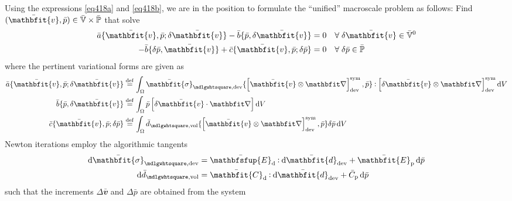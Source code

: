 \documentclass[10pt,a4paper]{article}
\renewcommand{\ta}[1]{\mathbfit{#1}}
\renewcommand{\ts}[1]{\mathbfit{#1}}
\renewcommand{\tf}[1]{\mathbfsfup{#1}}
\renewcommand{\Box}{\mdlgwhtsquare}
\newcommand{\ded}{\mathrm{d}}
\newcommand{\dep}{\mathrm{p}}
\begin{document}
Using the expressions \eqref{eq418a} and \eqref{eq418b}, we are in the position to formulate the ``unified'' macroscale problem as follows: Find $(\bar{\ta v},\bar p) \in\bar{\set V}\times\bar{\set{P}}$ that solve
\begin{align}
 \bar a\{\bar{\ta v},\bar p; \delta\bar{\ta v}\} - \bar b\{\bar p, \delta\bar{\ta v}\} &= 0   \quad \forall\; \delta\bar{\ta v} \in \bar{\set{V}}^0
 \label{eq411a}\\
 - \bar b\{\delta\bar p, \bar{\ta v}\} + \bar c\{\bar{\ta v}, \bar p; \delta\bar p\}&= 0   \quad \forall\; \delta\bar p \in \bar{\set{P}}
 \label{eq411b}
\end{align}
where the pertinent variational forms are given as
\begin{align}
 \bar a\{\bar{\ta v},\bar p; \delta\bar{\ta v}\} &\defeq \int_\Omega \bar{\ts\sigma}_{\Box,\dev}\{\left[\bar{\ta v}\outerp \diff\right]^\sym_\dev,\bar p\}\dprod \left[\delta\bar{\ta v}\outerp \diff\right]^\sym_\dev \dif V
 \label{eq412a}\\
 \bar b\{\bar p, \delta\bar{\ta v}\}             &\defeq \int_\Omega \bar p\left[\delta\bar{\ta v}\cdot\diff\right]\dif V
 \label{eq412b}\\
 \bar c\{\bar{\ta v}, \bar p; \delta\bar p\}     &\defeq \int_\Omega \bar d_{\Box,\vol}\{\left[\bar{\ta v}\outerp \diff\right]^\sym_\dev,\bar p\}\delta\bar p\dif V
 \label{eq412c}
\end{align}
Newton iterations employ the algorithmic tangents
\begin{align}
 \dif \bar{\ts\sigma}_{\Box,\dev} &= \bar{\tf E}_\ded \dprod \dif\bar{\ts d}_\dev + \bar{\ts E}_\dep \dif\bar{p}
 \label{eq413a} \\
 \dif \bar{d}_{\Box,\vol} &= \bar{\ts C}_\ded \dprod \dif \bar{\ts d}_\dev + \bar{C}_\dep \dif\bar{p}
 \label{eq413b}
\end{align}
such that the increments $\Delta\bar{\ta v}$ and $\Delta\bar{p}$ are obtained from the system
\end{document}
